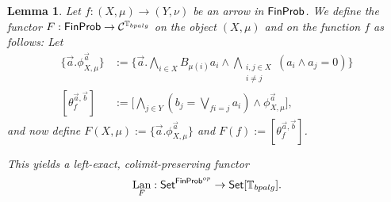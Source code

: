 \documentclass[a4paper]{amsproc}
\theoremstyle{plain}
\newtheorem{lemma}[theorem]{Lemma}
\theoremstyle{definition}
\theoremstyle{remark}
\numberwithin{equation}{section}
\DeclareMathOperator{\Lan}{Lan}
\newcommand{\Set}{\textup{\textsf{Set}}}
\newcommand{\FinProb}{\textup{\textsf{FinProb}}}
\begin{document}
\begin{lemma} \label{inverse}
Let $f: (X,\mu) \to (Y, \nu)$ be an arrow in $\FinProb$. We define the functor $F: \FinProb \to \mathcal{C}^{\mathbb{T}_{bpalg}}$ on the object $(X,\mu)$ and on the function $f$ as follows: Let
\begin{align*}
\{\vec{a} . \phi_{X,\mu}^{\vec{a}}\} &:= \Bigg \{ \vec{a} . \bigwedge_{i \in X} B_{\mu(i)} a_i \wedge \bigwedge_{\substack{i,j \in X \\ i \neq j}} (a_i \wedge a_j = 0) \Bigg \} \\
[\theta_f^{\vec{a}, \vec{b}}] &:= \Bigg [ \bigwedge_{j \in Y} (b_j = \bigvee_{f i = j} a_i) \wedge \phi_{X,\mu}^{\vec{a}} \Bigg] ,
\end{align*}
and now define $F(X,\mu) := \{\vec{a} . \phi_{X,\mu}^{\vec{a}}\}$ and $F(f) := [\theta_f^{\vec{a}, \vec{b}}]$.

This yields a left-exact, colimit-preserving functor
\[
    \Lan_F: \Set^{\FinProb^{op}} \to \Set[\mathbb{T}_{bpalg}] .
\]
\end{lemma}
\end{document}
